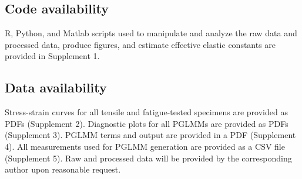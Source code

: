 \documentclass[twocolumn, linenumbers, superscriptaddress, nofootinbib]{revtex4-1}
\begin{document}
		\subsection*{Code availability}
			R, Python, and Matlab scripts used to manipulate and analyze the raw data and processed data, produce figures, and estimate effective elastic constants are provided in Supplement 1.
			
		\subsection*{Data availability}
			Stress-strain curves for all tensile and fatigue-tested specimens are provided as PDFs (Supplement 2).
			Diagnostic plots for all PGLMMs are provided as PDFs (Supplement 3). PGLMM terms and output are provided in a PDF (Supplement 4). All measurements used for PGLMM generation are provided as a CSV file (Supplement 5). Raw and processed data will be provided by the corresponding author upon reasonable request.
\end{document}
